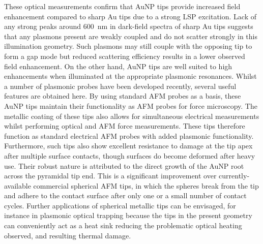 \documentclass{article}
\begin{document}
These optical measurements confirm that AuNP tips provide increased field enhancement compared to sharp Au tips due to a strong LSP excitation. Lack of any strong peaks around \SI{600}{nm} in dark-field spectra of sharp Au tips suggests that any plasmons present are weakly coupled and do not scatter strongly in this illumination geometry. Such plasmons may still couple with the opposing tip to form a gap mode but reduced scattering efficiency results in a lower observed field enhancement. On the other hand, AuNP tips are well suited to high enhancements when illuminated at the appropriate plasmonic resonances.
Whilst a number of plasmonic probes have been developed recently, several useful features are obtained here. By using standard AFM probes as a basis, these AuNP tips maintain their functionality as AFM probes for force microscopy. The metallic coating of these tips also allows for simultaneous electrical measurements whilst performing optical and AFM force measurements. These tips therefore function as standard electrical AFM probes with added plasmonic functionality.
Furthermore, such tips also show excellent resistance to damage at the tip apex after multiple surface contacts, though surfaces do become deformed after heavy use. Their robust nature is attributed to the direct growth of the AuNP root across the pyramidal tip end. This is a significant improvement over currently-available commercial spherical AFM tips, in which the spheres break from the tip and adhere to the contact surface after only one or a small number of contact cycles.
Further applications of spherical metallic tips can be envisaged, for instance in plasmonic optical trapping \cite{lindquist2013} because the tips in the present geometry can conveniently act as a heat sink reducing the problematic optical heating observed, and resulting thermal damage.
\end{document}
